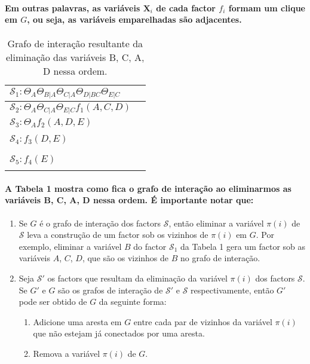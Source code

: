 \documentclass[a4paper,10pt]{article}
\theoremstyle{plain}
\begin{document}
\paragraph{
  Em outras palavras, as variáveis $\textbf{X}_i$ de cada factor $f_i$ formam um clique em $G$, ou
  seja, as variáveis emparelhadas são adjacentes.
}

\begin{table}[h]
  \begin{center}
    \begin{tabular}{l | c}
      $\mathcal{S}_1: \Theta_A \Theta_{B|A} \Theta_{C|A} \Theta_{D|BC} \Theta_{E|C}$ &  \\
      \hline
      $\mathcal{S}_2: \Theta_A \Theta_{C|A} \Theta_{E|C} f_1(A, C, D)$ &  \\
      \hline
      $\mathcal{S}_3: \Theta_A f_2(A, D, E)$ &  \\
      \hline
      & \\
      $\mathcal{S}_4: f_3(D, E)$ &  \\
      & \\
      \hline
      & \\
      $\mathcal{S}_5: f_4(E)$ &  \\
      & \\
    \end{tabular}
    \caption{Grafo de interação resultante da eliminação das variáveis B, C, A, D nessa ordem.}
  \end{center}
\end{table}

\paragraph{
  A Tabela 1 mostra como fica o grafo de interação ao eliminarmos as variáveis B, C, A, D nessa
  ordem. É importante notar que:
}

\begin{enumerate}
  \item Se $G$ é o grafo de interação dos factors $\mathcal{S}$, então eliminar a variável $\pi(i)$
    de $\mathcal{S}$ leva a construção de um factor sob os vizinhos de $\pi(i)$ em $G$. Por exemplo,
    eliminar a variável $B$ do factor $\mathcal{S}_1$ da Tabela 1 gera um factor sob as variáveis
    $A$, $C$, $D$, que são os vizinhos de $B$ no grafo de interação.
  \item Seja $\mathcal{S}'$ os factors que resultam da eliminação da variável $\pi(i)$ dos factors
    $\mathcal{S}$. Se $G'$ e $G$ são os grafos de interação de $\mathcal{S}'$ e $\mathcal{S}$
    respectivamente, então $G'$ pode ser obtido de $G$ da seguinte forma:
    \begin{enumerate}
      \item Adicione uma aresta em $G$ entre cada par de vizinhos da variável $\pi(i)$ que não
        estejam já conectados por uma aresta.
      \item Remova a variável $\pi(i)$ de $G$.
    \end{enumerate}
\end{enumerate}
\end{document}
